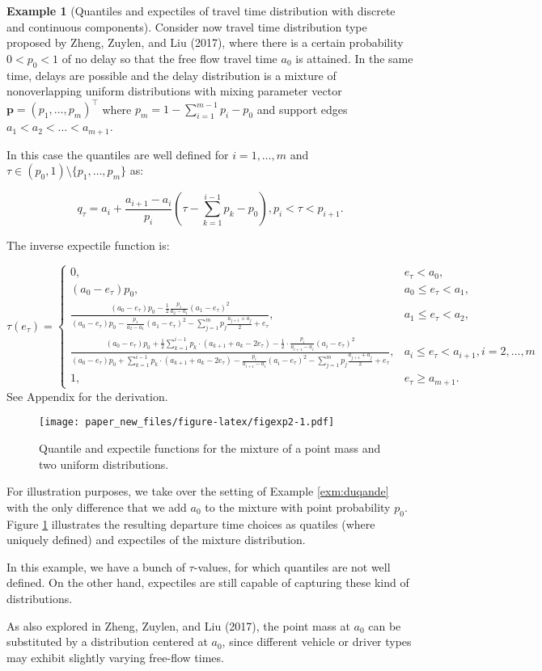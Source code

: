 \documentclass[
]{article}
\theoremstyle{definition}
\theoremstyle{definition}
\newtheorem{example}{Example}[section]
\theoremstyle{definition}
\theoremstyle{definition}
\theoremstyle{remark}
\begin{document}
\begin{example}[Quantiles and expectiles of travel time distribution with discrete and continuous components]
\protect\hypertarget{exm:qdzheng}{}\label{exm:qdzheng}Consider now travel time distribution type proposed by Zheng, Zuylen, and Liu (2017), where there is a certain probability \(0<p_0<1\) of no delay so that the free flow travel time \(a_0\) is attained. In the same time, delays are possible and the delay distribution is a mixture of nonoverlapping uniform distributions with mixing parameter vector \(\mathbf p=(p_1,\ldots,p_m)^\top\) where \(p_m=1-\sum_{i=1}^{m-1}p_i-p_0\) and support edges \(a_1<a_2<\ldots<a_{m+1}\).

In this case the quantiles are well defined for \(i=1,\ldots, m\) and \(\tau\in(p_0,1)\setminus\{p_1,\ldots,p_m\}\) as:

\[q_\tau = a_{i} + \frac{a_{i+1}-a_{i}}{p_i}(\tau-\sum_{k=1}^{i-1}p_{k} - p_0), p_i<\tau<p_{i+1}.\]

The inverse expectile function is:

\[\tau(e_\tau) = 
\begin{cases}
0,&e_\tau<a_0,\\
(a_0-e_\tau)p_0,&a_0\leq e_\tau<a_1,\\
\frac{(a_0-e_\tau)p_0-\frac 12\frac{p_1}{a_2-a_1}(a_1-e_\tau)^2}  {(a_0-e_\tau)p_0-\frac{p_1}{a_2-a_1}(a_1-e_\tau)^2- \sum_{j=1}^mp_j\frac{a_{j+1}+a_j}2 +e_\tau} ,&a_1\leq e_\tau< a_2,\\
\frac{(a_0-e_\tau)p_0+\frac 12\sum_{k=1}^{i-1}p_k\cdot (a_{k+1}+a_{k}-2e_\tau) -\frac 12 \cdot \frac{p_i}{a_{i+1}-a_i}(a_i-e_\tau)^2}  {(a_0-e_\tau)p_0+\sum_{k=1}^{i-1}p_k\cdot (a_{k+1}+a_{k}-2e_\tau) -\frac{p_i}{a_{i+1}-a_i}(a_i-e_\tau)^2- \sum_{j=1}^mp_j\frac{a_{j+1}+a_j}2 +e_\tau} ,&a_i\leq e_\tau< a_{i+1},i=2,\ldots, m\\
1, &e_\tau\geq a_{m+1}.
\end{cases}\]
See Appendix for the derivation.

\begin{figure}
\centering
\texttt{[image: paper\_new\_files/figure-latex/figexp2-1.pdf]}
\caption{\label{fig:figexp2}Quantile and expectile functions for the mixture of a point mass and two uniform distributions.}
\end{figure}

For illustration purposes, we take over the setting of Example \ref{exm:duqande} with the only difference that we add \(a_0\) to the mixture with point probability \(p_0\). Figure \ref{fig:figexp2} illustrates the resulting departure time choices as quatiles (where uniquely defined) and expectiles of the mixture distribution.

In this example, we have a bunch of \(\tau\)-values, for which quantiles are not well defined. On the other hand, expectiles are still capable of capturing these kind of distributions.

As also explored in Zheng, Zuylen, and Liu (2017), the point mass at \(a_0\) can be substituted by a distribution centered at \(a_0\), since different vehicle or driver types may exhibit slightly varying free-flow times.
\end{example}
\end{document}
